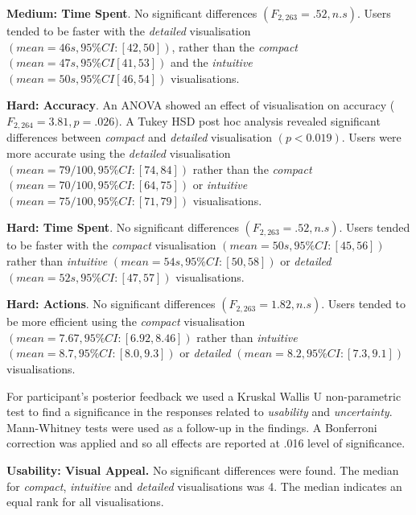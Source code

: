 \documentclass[final,5p,times,twocolumn,authoryear]{elsarticle}
\begin{document}
\textbf{Medium:  Time Spent}. No significant differences $(F_{2, 263} = .52, n.s)$. Users tended to be faster with the \emph{detailed} visualisation $(mean = 46s, 95\% CI: [42, 50])$, rather than the \emph{compact} $(mean = 47s, 95\% CI[41,53])$ and the \emph{intuitive} $(mean = 50s, 95\% CI[46,54])$ visualisations.

\textbf{Hard:  Accuracy}. An ANOVA showed an effect of visualisation on accuracy ($F_{2, 264} = 3.81, p = .026)$. A Tukey HSD post hoc analysis revealed significant differences between \emph{compact} and \emph{detailed} visualisation $(p<0.019)$.  Users were more accurate using the \emph{detailed} visualisation $(mean = 79/100, 95\% CI: [74, 84])$ rather than the \emph{compact} $(mean = 70/100, 95\% CI: [64, 75])$ or \emph{intuitive} $(mean = 75/100, 95\% CI: [71, 79])$ visualisations.

\textbf{Hard:  Time Spent}. No significant differences $(F_{2, 263} = .52, n.s)$. Users tended to be faster with the \emph{compact} visualisation
$(mean = 50s, 95\% CI: [45, 56])$ rather than \emph{intuitive} $(mean = 54s, 95\% CI: [50, 58])$ or  \emph{detailed} $(mean = 52s, 95\% CI: [47, 57])$ visualisations.

\textbf{Hard:  Actions}. No significant differences $(F_{2, 263} = 1.82, n.s)$. Users tended to be more efficient using the \emph{compact} visualisation $(mean = 7.67, 95\% CI: [6.92, 8.46])$ rather than \emph{intuitive} $(mean = 8.7, 95\% CI: [8.0, 9.3])$ or \emph{detailed} $(mean = 8.2, 95\% CI: [7.3, 9.1])$ visualisations.

For participant's posterior feedback we used a Kruskal Wallis U non-parametric test to find a significance in the responses related to \emph{usability} and \emph{uncertainty}. Mann-Whitney tests were used as a follow-up in the findings. A Bonferroni correction was applied and so all effects are reported at .016 level of significance.



\textbf{Usability: Visual Appeal.}  No significant differences were found. The median for \emph{compact}, \emph{intuitive} and \emph{detailed} visualisations was 4. The median indicates an equal rank for all visualisations.
\end{document}
